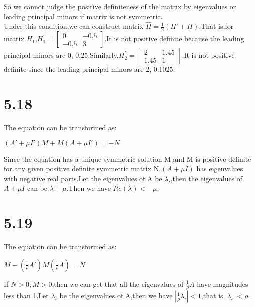 \documentclass{article}
\begin{document}
So we cannot judge the positive definiteness of the matrix by eigenvalues or leading principal minors if matrix is not symmetric.\\

Under this condition,we can construct matrix $\hat{H}=\frac{1}{2}(H'+H)$.That is,for matrix $H_1$,$H_1^{\prime}=\left[\begin{array}{ll} 0 & -0.5\\-0.5 & 3\end{array}\right]$.It is not positive definite because the leading principal minors are 0,-0.25.Similarly,$H_2^{\prime}=\left[\begin{array}{ll} 2 & 1.45\\1.45 & 1\end{array}\right]$.It is not positive definite since the leading principal minors are 2,-0.1025.\\

\section*{5.18}

The equation can be transformed as:\\
\begin{center}
    $(A'+\mu I')M+M(A+\mu I')=-N$
\end{center}

Since the equation has a unique symmetric solution M and M is positive definite for any given positive definite symmetric matrix N,$(A+\mu I)$ has eigenvalues with negative real parts.Let the eigenvalues of A be $\lambda_i$,then the eigenvalues of $A+\mu I$ can be $\lambda+\mu$.Then we have $Re(\lambda)<-\mu$.\\

\section*{5.19}

The equation can be transformed as:\\
\begin{center}
    $M-(\frac{1}{\rho}A')M(\frac{1}{\rho}A)=N$
\end{center}

If $N>0,M>0$,then we can get that all the eigenvalues of $\frac{1}{\rho}A$ have magnitudes less than 1.Let $\lambda_i$ be the eigenvalues of A,then we have $\left|\frac{1}{\rho}\lambda_i\right|<1$,that is,$\left|\lambda_i\right|<\rho$.\\
\end{document}
